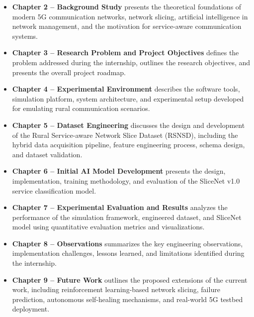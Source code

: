 \documentclass[12pt,a4paper]{report}
\begin{document}
	\begin{itemize}
		
		\item \textbf{Chapter 2 -- Background Study} presents the theoretical foundations of modern 5G communication networks, network slicing, artificial intelligence in network management, and the motivation for service-aware communication systems.
		
		\item \textbf{Chapter 3 -- Research Problem and Project Objectives} defines the problem addressed during the internship, outlines the research objectives, and presents the overall project roadmap.
		
		\item \textbf{Chapter 4 -- Experimental Environment} describes the software tools, simulation platform, system architecture, and experimental setup developed for emulating rural communication scenarios.
		
		\item \textbf{Chapter 5 -- Dataset Engineering} discusses the design and development of the Rural Service-aware Network Slice Dataset (RSNSD), including the hybrid data acquisition pipeline, feature engineering process, schema design, and dataset validation.
		
		\item \textbf{Chapter 6 -- Initial AI Model Development} presents the design, implementation, training methodology, and evaluation of the SliceNet v1.0 service classification model.
		
		\item \textbf{Chapter 7 -- Experimental Evaluation and Results} analyzes the performance of the simulation framework, engineered dataset, and SliceNet model using quantitative evaluation metrics and visualizations.
		
		\item \textbf{Chapter 8 -- Observations} summarizes the key engineering observations, implementation challenges, lessons learned, and limitations identified during the internship.
		
		\item \textbf{Chapter 9 -- Future Work} outlines the proposed extensions of the current work, including reinforcement learning-based network slicing, failure prediction, autonomous self-healing mechanisms, and real-world 5G testbed deployment.
		
	\end{itemize}
	
\end{document}
